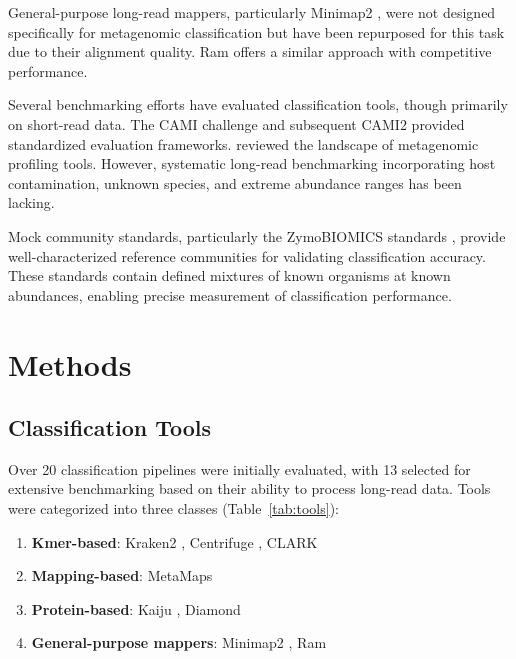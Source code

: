 \documentclass[11pt]{article}
\begin{document}
General-purpose long-read mappers, particularly Minimap2 \citep{li2018minimap2}, were not designed specifically for metagenomic classification but have been repurposed for this task due to their alignment quality. Ram \citep{vaser2021time} offers a similar approach with competitive performance.

Several benchmarking efforts have evaluated classification tools, though primarily on short-read data. The CAMI challenge \citep{sczyrba2017critical} and subsequent CAMI2 \citep{meyer2022critical} provided standardized evaluation frameworks. \citet{sun2021challenges} reviewed the landscape of metagenomic profiling tools. However, systematic long-read benchmarking incorporating host contamination, unknown species, and extreme abundance ranges has been lacking.

Mock community standards, particularly the ZymoBIOMICS standards \citep{zymo2021mock}, provide well-characterized reference communities for validating classification accuracy. These standards contain defined mixtures of known organisms at known abundances, enabling precise measurement of classification performance.

\section{Methods}

\subsection{Classification Tools}

Over 20 classification pipelines were initially evaluated, with 13 selected for extensive benchmarking based on their ability to process long-read data. Tools were categorized into three classes (Table~\ref{tab:tools}):

\begin{enumerate}
    \item \textbf{Kmer-based}: Kraken2 \citep{wood2019improved}, Centrifuge \citep{kim2016centrifuge}, CLARK \citep{ounit2015clark}
    \item \textbf{Mapping-based}: MetaMaps \citep{dilthey2019strain}
    \item \textbf{Protein-based}: Kaiju \citep{menzel2016fast}, Diamond \citep{buchfink2015fast}
    \item \textbf{General-purpose mappers}: Minimap2 \citep{li2018minimap2}, Ram \citep{vaser2021time}
\end{enumerate}
\end{document}
